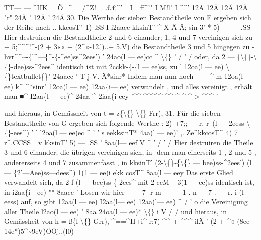 \documentclass[12pt,a4paper]{article}
\begin{document}
TT---    ---  \^{}IIK      \_  Ö\_\^{}  \_  /\^{}Z!   \_  ££\^{}'  \_I\_  ff\^{}'"        I   M!l'    I  \^{}\^{}' 12A        12Ä        12Ä        12Ä   "r"   24Ä    '    12Ä     '   24Ä 30. Die  Werthe  der  sieben  Bestandtheile  von  F  ergeben  sich  der  Reihe  nach ..  kkcosT" 1)   .SS I  i2aacc kksinT' \^{}  X  Ä  Ä;  sin  3'  * 5)       --- ---   .SS Hier  destruiren  die  Bestandtheile  2  und  6  einander;  1,  4  und  7  vereinigen  sich  zu +  5;\^{}\^{}\^{}!\^{}-(2  +  3««  +  (2\^{}«-12.')..+  5.V) die  Bestandtheile   3  und  5  hingegen  zu -hvr\^{}\^{}\textasciitilde{}-\{'\^{}---\{\^{}-\{-\^{}ee)ss\^{}2ees') '    24ao(l  ---  ee)cc    \^{}  \textbackslash\{\}       '  /  '  / oder,  da    2  ---  \{\textbackslash\{\}-\textbackslash\{\}-dee)ss-\^{}2ees\^{}   identisch  ist  mit    2cckk-\{-\{l  ---  ee)ss,    zu '     12oa(l  --- ee)    \textbackslash\{\}textbullet\{\}"  24aacc  ' T    j  V.         Ä*sinr* Indem  man  nun  noch    - ---   \^{}    m 12oa(l --- ee) k\^{} \^{}*sinr" 12oa(l  ---  ee)  12aa\{i---  ee) verwandelt ,  und  alles  vereinigt ,  erhält  man ■\^{}  I2aa\{l  ---  ee)\^{}  24aa  \^{}  2iaa\{i-eey '\^{}\^{}  \^{}\^{}\^{}\^{}\^{}  \^{}\^{}         \^{}  \^{}  \^{}  >  \^{}\^{}\^{}  '

und  hieraus,  in  Gemässheit  von    t  =  z\{\textbackslash\{\}-\textbackslash\{\}-Frr), 31. Für  die  sieben  Bestandtheile  von  G  ergeben  sich  folgende  Werthe  : 2)     +7;; --- r.  r--(l  ---  2eess-\textbackslash\{\}-ees\^{}) '         '     l2oa(l  ---  ee)ec    \^{}  '  ' s  eekksinT* 4aa(l --- ee)' ,.  Ze\^{}kkcosT\^{} 4)   7  r\^{}.CCSS \_v  kksinT' 5)       ---   .SS '  8aa(l--- eef    V  \^{}       '  /  '  / Hier  destruiren  die  Theile  3  und  6  einander;  die  übrigen  vereinigen  sich,  in- dem man  einerseits   1 ,  2  und  5 ,  andererseits  4  und  7  zusammenfasst ,  in kksinT'       (2-\textbackslash\{\}-\{\textbackslash\{\}  ---  bee)ss-\^{}2ees') (l  ---  \{2'---Aee)ss---dees\^{}) 1(1 --- ee)i ekk  cosT\^{} 8aa(l --- eey Das  erste  Glied  verwandelt  sich,  da  2-f-(l  ---  bee)ss-\{-2ees\^{}  mit  2  ccM+ 3(1  ---  ee)ss identisch  ist,  in i2aa\{i---ee)  "*      8aacc  ' Losen  wir  hier    -- --- 7-  r  m    --- --- 1-.  n  ---  7-. --- r.  i-(l  ---  eess)    auf,    so  gibt 12aa(l  --- ee)  I2aa(l--- ee)  12aa(l--- ee)    \^{}  /  '  o die  Vereinigung  aller  Theile l2ao(l --- ee)     '  8aa  24oa(l  --- ee)*    \textbackslash\{\}       i  V  /  / und  hieraus,  in  Gemässheit  von    h  =  ß\{l-\textbackslash\{\}-Grr), \^{}==\^{}H+i\^{}-r;7)-\^{}\^{}  +  \^{}\^{}\^{}-ilÄ-'-(2  +  \^{}«-(8ee-14e*)5\^{}\textasciitilde{}9eV)ÖÖj..(l0)
\end{document}
